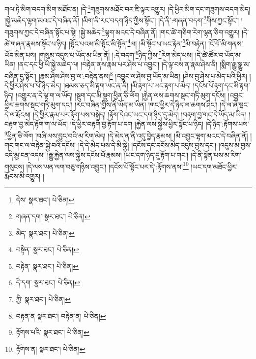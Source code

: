 གལ་ཏེ་མིག་བདག་མིག་མཐོང་ན། །དེ་\footnote{དེས་  སྣར་ཐང་།  པེ་ཅིན། }གཟུགས་མཐོང་བར་ཇི་ལྟར་འགྱུར། །དེ་ཕྱིར་མིག་དང་གཟུགས་བདག་མེད། །སྐྱེ་མཆེད་ལྷག་མའང་དེ་བཞིན་ནོ། །མིག་ནི་རང་བདག་ཉིད་ཀྱིས་སྟོང་། །དེ་ནི་:གཞན་བདག་\footnote{གཞན་དག་  སྣར་ཐང་།  པེ་ཅིན། }གིས་ཀྱང་སྟོང་། །གཟུགས་ཀྱང་དེ་བཞིན་སྟོང་པ་སྟེ། །སྐྱེ་མཆེད་\footnote{མེད་  སྣར་ཐང་།  པེ་ཅིན། }ལྷག་མའང་དེ་བཞིན་ནོ། །གང་ཚེ་གཅིག་རེག་ལྷན་ཅིག་འགྱུར། །དེ་ཚེ་གཞན་རྣམས་སྟོང་པ་ཉིད། །སྟོང་པའམ་མི་སྟོང་མི་སྟོན་\footnote{བསྟེན་  སྣར་ཐང་།  པེ་ཅིན། }ལ། །མི་སྟོང་པ་ཡང་རྟེན་\footnote{བརྟེན་  སྣར་ཐང་།  པེ་ཅིན། }མི་བརྟེན། །ངོ་བོ་མི་གནས་ཡོད་མིན་པས། །གསུམ་འདུས་པ་ཡོད་མ་ཡིན་ནོ། །:དེ་བདག་\footnote{དེ་དག་  སྣར་ཐང་།  པེ་ཅིན། }ཉིད་ཀྱིས་\footnote{ཀྱི་  སྣར་ཐང་།  པེ་ཅིན། }རེག་མེད་པས། །དེ་ཚེ་ཚོར་བ་ཡོད་མ་ཡིན། །ནང་དང་ཕྱི་ཡི་སྐྱེ་མཆེད་ལ། །བརྟེན་ནས་རྣམ་པར་ཤེས་པ་འབྱུང་། །དེ་ལྟ་བས་ན་རྣམ་ཤེས་ནི། །སྨིག་རྒྱུ་སྒྱུ་མ་བཞིན་དུ་སྟོང་། །རྣམ་ཤེས་ཤེས་བྱ་ལ་:བརྟེན་ནས།\footnote{བརྟན་ན  སྣར་ཐང་། བརྟེན་ན།  པེ་ཅིན། } །འབྱུང་ལ་ཤེས་བྱ་ཡོད་མ་ཡིན། །ཤེས་བྱ་ཤེས་པ་མེད་པའི་ཕྱིར། །དེ་ཕྱིར་ཤེས་པ་པོ་ཉིད་མེད། །ཐམས་ཅད་མི་རྟག་ཡང་ན་ནི། །མི་རྟག་པ་ཡང་རྟག་པ་མེད། །དངོས་པོ་རྟག་དང་མི་རྟག་ཉིད། །འགྱུར་ན་དེ་ལྟ་ག་ལ་ཡོད། །སྡུག་དང་མི་སྡུག་ཕྱིན་ཅི་ལོག །རྐྱེན་ལས་ཆགས་སྡང་གཏི་མུག་དངོས། །འབྱུང་ཕྱིར་ཆགས་སྡང་གཏི་མུག་དང་། །རང་བཞིན་གྱིས་ནི་ཡོད་མ་ཡིན། །གང་ཕྱིར་དེ་ཉིད་ལ་ཆགས་ཤིང་། །དེ་ལ་ཞེ་སྡང་དེ་ལ་རྨོངས། །དེ་ཕྱིར་རྣམ་པར་རྟོག་པས་བསྐྱེད། །རྟོག་དེའང་ཡང་དག་ཉིད་དུ་མེད། །བརྟག་བྱ་གང་དེ་ཡོད་མ་ཡིན། །བརྟག་བྱ་མེད་རྟོག་ག་ལ་ཡོད། །དེ་ཕྱིར་བརྟག་བྱ་རྟོག་པ་དག །རྐྱེན་ལས་སྐྱེས་ཕྱིར་སྟོང་པ་ཉིད། །དེ་ཉིད་:རྟོགས་པས་\footnote{རྟོགས་པའི་  སྣར་ཐང་།  པེ་ཅིན། }ཕྱིན་ཅི་ལོག །བཞི་ལས་བྱུང་བའི་མ་རིག་མེད། །དེ་མེད་ན་ནི་འདུ་བྱེད་རྣམས། །མི་འབྱུང་ལྷག་མའང་དེ་བཞིན་ནོ། །གང་གང་ལ་བརྟེན་སྐྱེ་བའི་དངོས། །དེ་དེ་མེད་པས་དེ་མི་སྐྱེ། །དངོས་དང་དངོས་མེད་འདུས་བྱས་དང་། །འདུས་མ་བྱས་འདི་མྱ་ངན་འདས། །རྒྱུ་རྐྱེན་ལས་སྐྱེས་དངོས་པོ་རྣམས། །ཡང་དག་ཉིད་དུ་རྟོག་པ་གང་། །དེ་ནི་སྟོན་པས་མ་རིག་གསུངས། །དེ་ལས་ཡན་ལག་བཅུ་གཉིས་འབྱུང་། །དངོས་པོ་སྟོང་པར་དེ་:རྟོགས་ནས།\footnote{རྟོགས་ན།  སྣར་ཐང་།  པེ་ཅིན། } །ཡང་དག་མཐོང་ཕྱིར་རྨོངས་མི་འགྱུར། །
